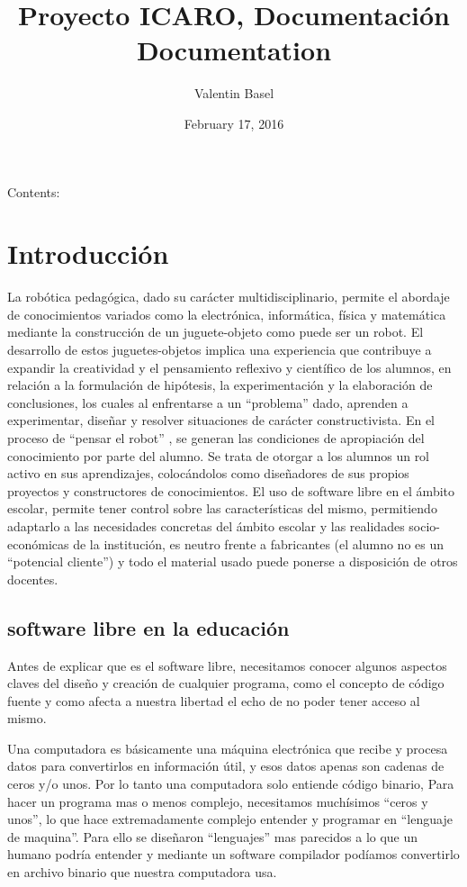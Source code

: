 \documentclass[letterpaper,10pt,english]{sphinxmanual}
\title{Proyecto ICARO, Documentación Documentation}
\date{February 17, 2016}
\author{Valentin Basel}
\begin{document}
\maketitle
\tableofcontents
{}\label{index::doc}


Contents:


\chapter{Introducción}
\label{introduccion:introduccion}\label{introduccion:welcome-to-proyecto-icaro-documentacion-s-documentation}\label{introduccion::doc}
La robótica pedagógica, dado su carácter multidisciplinario, permite el
abordaje de conocimientos variados como la electrónica, informática,
física y matemática mediante la construcción de un juguete-objeto
como puede ser un robot. El desarrollo de estos juguetes-objetos
implica una experiencia que contribuye a expandir la creatividad y el
pensamiento reflexivo y científico de los alumnos,
en relación a la formulación de hipótesis, la
experimentación y la elaboración de conclusiones, los cuales al
enfrentarse a un “problema” dado, aprenden a experimentar, diseñar y
resolver situaciones de carácter constructivista. En el proceso de
“pensar el robot” , se generan las condiciones de apropiación
del conocimiento por parte del alumno.
Se trata de otorgar a los alumnos un rol activo en sus aprendizajes,
colocándolos como diseñadores de sus propios proyectos y constructores
de conocimientos. El uso de software libre en el ámbito escolar,
permite tener control sobre las características del mismo,
permitiendo adaptarlo a las necesidades concretas del ámbito escolar
y las realidades socio-económicas de la institución, es neutro frente
a fabricantes (el alumno no es un “potencial cliente”) y todo el
material usado puede ponerse a disposición de otros docentes.


\section{software libre en la educación}
\label{introduccion:software-libre-en-la-educacion}
Antes de explicar que es el software libre,
necesitamos conocer algunos aspectos claves del diseño y
creación de cualquier programa, como el concepto de código fuente y
como afecta a nuestra libertad el echo de no poder tener acceso al mismo.

Una computadora es básicamente una máquina electrónica que recibe y
procesa datos para convertirlos en información útil, y esos datos
apenas son cadenas de ceros y/o unos. Por lo tanto una computadora
solo entiende código binario, Para hacer
un programa mas o menos complejo, necesitamos muchísimos “ceros y unos”,
lo que hace extremadamente complejo entender y programar en
“lenguaje de maquina”. Para ello se diseñaron “lenguajes” mas parecidos
a lo que un humano podría entender y mediante un software
compilador podíamos convertirlo en archivo binario que nuestra
computadora usa.
\end{document}
